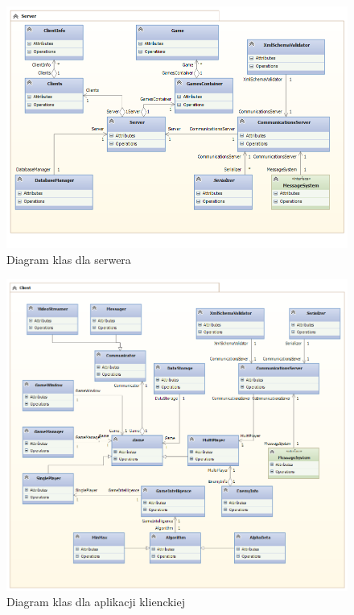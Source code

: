 \documentclass[12pt]{article}
\begin{document}
\begin{figure}[!ht]
  \centering
	\includegraphics[scale=0.7]{serverClassDiagram}
	 \caption{Diagram klas dla serwera}
\end{figure}

\newpage

\begin{figure}[!ht]
  \centering
	\includegraphics[scale=0.6]{clientClassDiagram}
	 \caption{Diagram klas dla aplikacji klienckiej}
\end{figure}

\newpage
\end{document}
